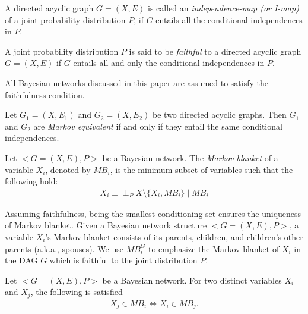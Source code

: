 \begin{definition}
\label{def:imap}
A directed acyclic graph $G=(X,E)$ is called an \textit{independence-map (or I-map)} of a joint probability distribution $P$, if $G$ entails all the conditional independences in $P$.
\end{definition}

\begin{definition}
\label{def:faithful}
A joint probability distribution $P$ is said to be \textit{faithful} to a directed acyclic graph $G=(X,E)$ if $G$ entails all and only the conditional independences in $P$.
\end{definition}
All Bayesian networks discussed in this paper are assumed to satisfy the faithfulness condition. 

\begin{definition}
\label{def:equivalent}
Let $G_1=(X,E_1)$ and $G_2=(X,E_2)$ be two directed acyclic graphs. Then $G_1$ and $G_2$ are \textit{Markov equivalent} if and only if they entail the same conditional independences.
\end{definition}

\begin{definition}
\label{def:mb}
Let $<G=(X,E),P>$ be a Bayesian network. The \textit{Markov blanket} of a variable $X_i$, denoted by $MB_i$, is the minimum subset of variables such that the following hold: 
\begin{align*}
X_i \!\perp\!\!\!\perp_P X\setminus \{X_i, MB_i\} \mid MB_i
\end{align*}
\end{definition}
Assuming faithfulness, being the smallest conditioning set ensures the uniqueness of Markov blanket. Given a Bayesian network structure $<G=(X, E), P>$, a variable $X_i$'s Markov blanket consists of its parents, children, and children's other parents (a.k.a., spouses). We use $MB^G_i$ to emphasize the Markov blanket of $X_i$ in the DAG $G$ which is faithful to the joint distribution $P$. 
\begin{proposition}
\label{prop:sym}
Let $<G=(X,E),P>$ be a Bayesian network. For two distinct variables $X_i$ and $X_j$, the following is satisfied
\begin{align*}
X_j \in MB_i \Leftrightarrow X_i \in MB_j.
\end{align*}
\end{proposition}


